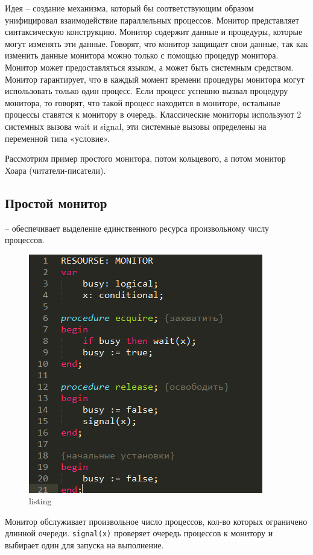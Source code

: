 Идея – создание механизма, который бы соответствующим образом унифицировал взаимодействие параллельных процессов. Монитор представляет синтаксическую конструкцию. Монитор содержит данные и процедуры, которые могут изменять эти данные. Говорят, что монитор защищает свои данные, так как изменить данные монитора можно только с помощью процедур монитора. Монитор может предоставляться языком, а может быть системным средством. Монитор гарантирует, что в каждый момент времени процедуры монитора могут использовать только один процесс. Если процесс успешно вызвал процедуру монитора, то говорят, что такой процесс находится в мониторе, остальные процессы ставятся к монитору в очередь. Классические мониторы используют 2 системных вызова wait и signal, эти системные вызовы определены на переменной типа «условие».

Рассмотрим пример простого монитора, потом кольцевого, а потом монитор Хоара (читатели-писатели).

\subsection{Простой монитор} – обеспечивает выделение единственного ресурса произвольному числу процессов. \cite{C_Deitel2}

\begin{figure}[H]
    \centering
    \includegraphics{listing/3.png}
    \caption{listing}
\end{figure}

Монитор обслуживает произвольное число процессов, кол-во которых ограничено длинной очереди.  
\verb|signal(x)| проверяет очередь процессов к монитору и выбирает один для запуска на выполнение.


